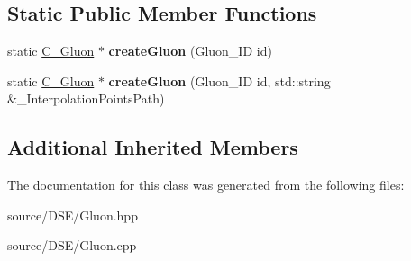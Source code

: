 \subsection*{Static Public Member Functions}
\begin{DoxyCompactItemize}
\item 
\hypertarget{class_c___gluon_aa6b6cb7bfb183bfae684fa6a840643ff}{static \hyperlink{class_c___gluon}{C\-\_\-\-Gluon} $\ast$ {\bfseries create\-Gluon} (Gluon\-\_\-\-I\-D id)}\label{class_c___gluon_aa6b6cb7bfb183bfae684fa6a840643ff}

\item 
\hypertarget{class_c___gluon_a1fa97ddd62ec8725c5c4d1c83aac3d5e}{static \hyperlink{class_c___gluon}{C\-\_\-\-Gluon} $\ast$ {\bfseries create\-Gluon} (Gluon\-\_\-\-I\-D id, std\-::string \&\-\_\-\-Interpolation\-Points\-Path)}\label{class_c___gluon_a1fa97ddd62ec8725c5c4d1c83aac3d5e}

\end{DoxyCompactItemize}
\subsection*{Additional Inherited Members}


The documentation for this class was generated from the following files\-:\begin{DoxyCompactItemize}
\item 
source/\-D\-S\-E/Gluon.\-hpp\item 
source/\-D\-S\-E/Gluon.\-cpp\end{DoxyCompactItemize}
